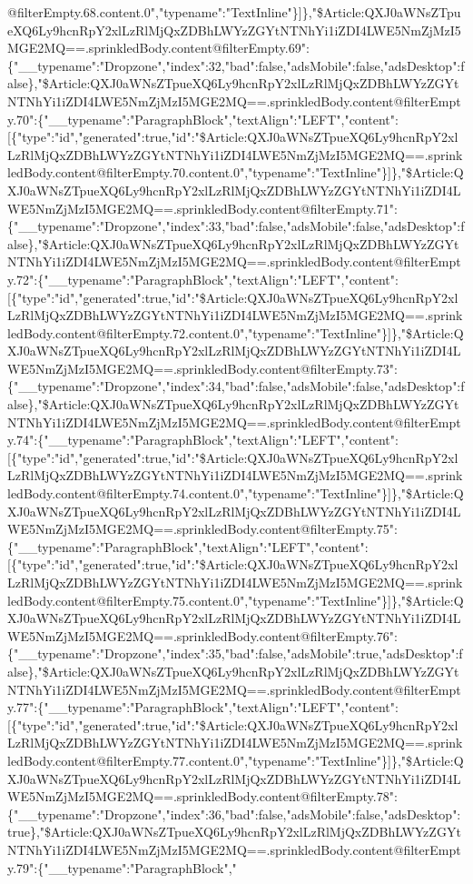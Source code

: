 @filterEmpty.68.content.0","typename":"TextInline"\}{]}\},"\$Article:QXJ0aWNsZTpueXQ6Ly9hcnRpY2xlLzRlMjQxZDBhLWYzZGYtNTNhYi1iZDI4LWE5NmZjMzI5MGE2MQ==.sprinkledBody.content@filterEmpty.69":\{"\_\_typename":"Dropzone","index":32,"bad":false,"adsMobile":false,"adsDesktop":false\},"\$Article:QXJ0aWNsZTpueXQ6Ly9hcnRpY2xlLzRlMjQxZDBhLWYzZGYtNTNhYi1iZDI4LWE5NmZjMzI5MGE2MQ==.sprinkledBody.content@filterEmpty.70":\{"\_\_typename":"ParagraphBlock","textAlign":"LEFT","content":{[}\{"type":"id","generated":true,"id":"\$Article:QXJ0aWNsZTpueXQ6Ly9hcnRpY2xlLzRlMjQxZDBhLWYzZGYtNTNhYi1iZDI4LWE5NmZjMzI5MGE2MQ==.sprinkledBody.content@filterEmpty.70.content.0","typename":"TextInline"\}{]}\},"\$Article:QXJ0aWNsZTpueXQ6Ly9hcnRpY2xlLzRlMjQxZDBhLWYzZGYtNTNhYi1iZDI4LWE5NmZjMzI5MGE2MQ==.sprinkledBody.content@filterEmpty.71":\{"\_\_typename":"Dropzone","index":33,"bad":false,"adsMobile":false,"adsDesktop":false\},"\$Article:QXJ0aWNsZTpueXQ6Ly9hcnRpY2xlLzRlMjQxZDBhLWYzZGYtNTNhYi1iZDI4LWE5NmZjMzI5MGE2MQ==.sprinkledBody.content@filterEmpty.72":\{"\_\_typename":"ParagraphBlock","textAlign":"LEFT","content":{[}\{"type":"id","generated":true,"id":"\$Article:QXJ0aWNsZTpueXQ6Ly9hcnRpY2xlLzRlMjQxZDBhLWYzZGYtNTNhYi1iZDI4LWE5NmZjMzI5MGE2MQ==.sprinkledBody.content@filterEmpty.72.content.0","typename":"TextInline"\}{]}\},"\$Article:QXJ0aWNsZTpueXQ6Ly9hcnRpY2xlLzRlMjQxZDBhLWYzZGYtNTNhYi1iZDI4LWE5NmZjMzI5MGE2MQ==.sprinkledBody.content@filterEmpty.73":\{"\_\_typename":"Dropzone","index":34,"bad":false,"adsMobile":false,"adsDesktop":false\},"\$Article:QXJ0aWNsZTpueXQ6Ly9hcnRpY2xlLzRlMjQxZDBhLWYzZGYtNTNhYi1iZDI4LWE5NmZjMzI5MGE2MQ==.sprinkledBody.content@filterEmpty.74":\{"\_\_typename":"ParagraphBlock","textAlign":"LEFT","content":{[}\{"type":"id","generated":true,"id":"\$Article:QXJ0aWNsZTpueXQ6Ly9hcnRpY2xlLzRlMjQxZDBhLWYzZGYtNTNhYi1iZDI4LWE5NmZjMzI5MGE2MQ==.sprinkledBody.content@filterEmpty.74.content.0","typename":"TextInline"\}{]}\},"\$Article:QXJ0aWNsZTpueXQ6Ly9hcnRpY2xlLzRlMjQxZDBhLWYzZGYtNTNhYi1iZDI4LWE5NmZjMzI5MGE2MQ==.sprinkledBody.content@filterEmpty.75":\{"\_\_typename":"ParagraphBlock","textAlign":"LEFT","content":{[}\{"type":"id","generated":true,"id":"\$Article:QXJ0aWNsZTpueXQ6Ly9hcnRpY2xlLzRlMjQxZDBhLWYzZGYtNTNhYi1iZDI4LWE5NmZjMzI5MGE2MQ==.sprinkledBody.content@filterEmpty.75.content.0","typename":"TextInline"\}{]}\},"\$Article:QXJ0aWNsZTpueXQ6Ly9hcnRpY2xlLzRlMjQxZDBhLWYzZGYtNTNhYi1iZDI4LWE5NmZjMzI5MGE2MQ==.sprinkledBody.content@filterEmpty.76":\{"\_\_typename":"Dropzone","index":35,"bad":false,"adsMobile":true,"adsDesktop":false\},"\$Article:QXJ0aWNsZTpueXQ6Ly9hcnRpY2xlLzRlMjQxZDBhLWYzZGYtNTNhYi1iZDI4LWE5NmZjMzI5MGE2MQ==.sprinkledBody.content@filterEmpty.77":\{"\_\_typename":"ParagraphBlock","textAlign":"LEFT","content":{[}\{"type":"id","generated":true,"id":"\$Article:QXJ0aWNsZTpueXQ6Ly9hcnRpY2xlLzRlMjQxZDBhLWYzZGYtNTNhYi1iZDI4LWE5NmZjMzI5MGE2MQ==.sprinkledBody.content@filterEmpty.77.content.0","typename":"TextInline"\}{]}\},"\$Article:QXJ0aWNsZTpueXQ6Ly9hcnRpY2xlLzRlMjQxZDBhLWYzZGYtNTNhYi1iZDI4LWE5NmZjMzI5MGE2MQ==.sprinkledBody.content@filterEmpty.78":\{"\_\_typename":"Dropzone","index":36,"bad":false,"adsMobile":false,"adsDesktop":true\},"\$Article:QXJ0aWNsZTpueXQ6Ly9hcnRpY2xlLzRlMjQxZDBhLWYzZGYtNTNhYi1iZDI4LWE5NmZjMzI5MGE2MQ==.sprinkledBody.content@filterEmpty.79":\{"\_\_typename":"ParagraphBlock","